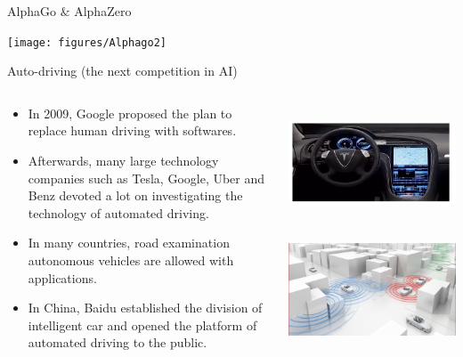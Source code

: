 \documentclass{beamer}
\begin{document}
\begin{CJK*}{UTF8}{gbsn}
\begin{frame}{AlphaGo $\&$ AlphaZero}
	\begin{center}
		\texttt{[image: figures/Alphago2]} 
	\end{center}
\end{frame}


\begin{frame}{Auto-driving (the next competition in AI)}
\begin{columns}
\begin{column}{0.6\textwidth}
\begin{itemize}
\item In 2009, Google proposed the plan to replace human driving with softwares.

\item Afterwards, many large technology companies such as Tesla, Google, Uber and Benz devoted a lot on investigating the technology of automated driving.

\item In many countries, road examination autonomous vehicles are allowed with applications.

\item In China, Baidu established the division of intelligent car and opened the platform of automated driving to the public.

\end{itemize}
\end{column}

\begin{column}{0.4\textwidth}
\centering  
\includegraphics[width=\textwidth]{figures/AutomatedDriving1}  \\
\centering  
\includegraphics[width=\textwidth]{figures/AutomatedDriving2}  
\end{column}
\end{columns}
\end{frame}



\end{CJK*}
\end{document}
